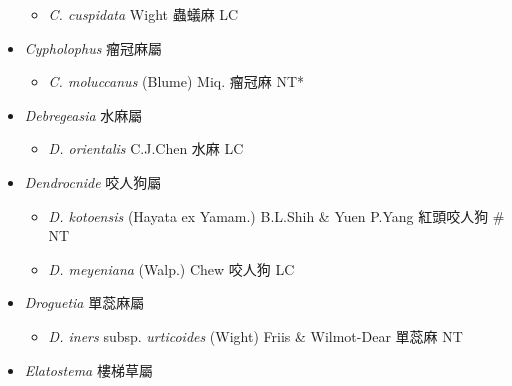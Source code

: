 \begin{itemize}
  \begin{itemize}
        \item[] \textit{C. cuspidata} Wight  蟲蟻麻   LC
  \end{itemize}
 \item[] \textit{Cypholophus} 瘤冠麻屬
                                
  \begin{itemize}
        \item[] \textit{C. moluccanus} (Blume) Miq.  瘤冠麻   NT*
  \end{itemize}
 \item[] \textit{Debregeasia} 水麻屬
                                
  \begin{itemize}
        \item[] \textit{D. orientalis} C.J.Chen  水麻   LC
  \end{itemize}
 \item[] \textit{Dendrocnide} 咬人狗屬
                                
  \begin{itemize}
        \item[] \textit{D. kotoensis} (Hayata ex Yamam.) B.L.Shih \& Yuen P.Yang  紅頭咬人狗  \# NT
        \item[] \textit{D. meyeniana} (Walp.) Chew  咬人狗   LC
  \end{itemize}
 \item[] \textit{Droguetia} 單蕊麻屬
                                
  \begin{itemize}
        \item[] \textit{D. iners} subsp. \textit{urticoides} (Wight) Friis \& Wilmot-Dear  單蕊麻   NT
  \end{itemize}
 \item[] \textit{Elatostema} 樓梯草屬
                                

\end{itemize}
